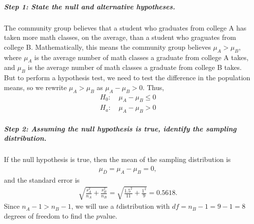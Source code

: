 \documentclass[letterpaper,10pt,english]{jupyterBook}
\begin{document}
\subparagraph{Step 1: State the null and alternative hypotheses.}
\label{\detokenize{Ch9 Hypothesis Tests of Two or More Populations/9.1 Hypothesis Testing Two Population Means:step-1-state-the-null-and-alternative-hypotheses}}
\sphinxAtStartPar
The community group believes that a student who graduates from college A has taken more math classes, on the average, than a student who graguates from college B. Mathematically, this means the community group believes \(\mu_A > \mu_B\), where \(\mu_A\) is the average number of math classes a graduate from college A takes, and \(\mu_B\) is the average number of math classes a graduate from college B takes. But to perform a hypothesis test, we need to test the difference in the population means, so we rewrite \(\mu_A > \mu_B\) as  \(\mu_A - \mu_B > 0\). Thus,
\begin{align*}
H_0:&\ \mu_A - \mu_B \leq 0 \\
H_a:&\ \mu_A - \mu_B > 0
\end{align*}

\subparagraph{Step 2: Assuming the null hypothesis is true, identify the sampling distribution.}
\label{\detokenize{Ch9 Hypothesis Tests of Two or More Populations/9.1 Hypothesis Testing Two Population Means:step-2-assuming-the-null-hypothesis-is-true-identify-the-sampling-distribution}}
\sphinxAtStartPar
If the null hypothesis is true, then the mean of the sampling distribution is
\begin{equation*}
\begin{split} \mu_{\overline{D}} = \mu_A - \mu_B = 0, \end{split}
\end{equation*}
\sphinxAtStartPar
and the standard error is
\begin{equation*}
\begin{split} \sqrt{\frac{s_A^2}{n_A} + \frac{s_B^2}{n_B}} = \sqrt{\frac{1.5^2}{11} + \frac{1^2}{9}} = 0.5618. \end{split}
\end{equation*}
\sphinxAtStartPar
Since \(n_A - 1 > n_B - 1\), we will use a \(t\)\sphinxhyphen{}distribution with \(df = n_B - 1 = 9 - 1 = 8\) degrees of freedom to find the \(p\)\sphinxhyphen{}value.
\end{document}
